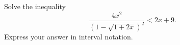 Solve the inequality
\[
\dfrac{4x^{2}}{\left(1-\sqrt{1+2x}\right)^2}<2x+9 .
\]
Express your answer in interval notation.
